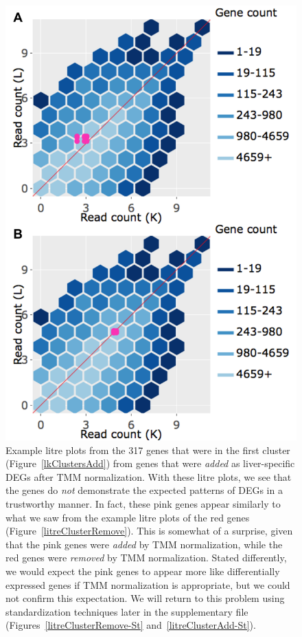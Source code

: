 \documentclass{article}
\begin{document}
  \null
  \begin{figure}[t!]
  \centerline{\includegraphics[width=0.7\columnwidth]{../MakeFigures/Dashboards/litreClusterAdd/litreClusterAdd.jpg}}
  \caption{Example litre plots from the 317 genes that were in the first cluster (Figure~\ref{lkClustersAdd}) from genes that were \textit{added} as liver-specific DEGs after TMM normalization. With these litre plots, we see that the genes do \textit{not} demonstrate the expected patterns of DEGs in a trustworthy manner. In fact, these pink genes appear similarly to what we saw from the example litre plots of the red genes (Figure~\ref{litreClusterRemove}). This is somewhat of a surprise, given that the pink genes were \textit{added} by TMM  normalization, while the red genes were \textit{removed} by TMM normalization. Stated differently, we would expect the pink genes to appear more like differentially expressed genes if TMM normalization is appropriate, but we could not confirm this expectation. We will return to this problem using standardization techniques later in the supplementary file (Figures~\ref{litreClusterRemove-St} and~\ref{litreClusterAdd-St}).
  \label{litreClusterAdd}}
  \end{figure}
  
\end{document}
